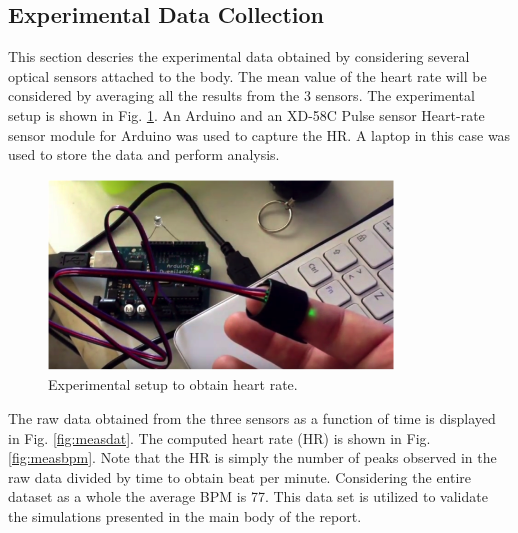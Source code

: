\documentclass[paper=a4, fontsize=11pt]{scrartcl}
\numberwithin{equation}{section}		%
\numberwithin{figure}{section}			%
\numberwithin{table}{section}		    %
\begin{document}
\newpage
\begin{appendices}

\section{Experimental Data Collection}\label{sec:A:exp}
This section descries the experimental data obtained by considering several optical sensors attached 
to the body. The mean value of the heart rate will be considered by averaging all the results from 
the 3 sensors. The experimental setup is shown in Fig. \ref{fig:exp}. An Arduino and an XD-58C Pulse 
sensor Heart-rate sensor module for Arduino was used to capture the HR. A laptop in this case was
used to store the data and perform analysis. \\

\begin{figure}[H]
	\begin{center} 
		\includegraphics[height=2in,width=3.6in]{hr_experiment} 
		\caption{Experimental setup to obtain heart rate.\label{fig:exp}} 
	\end{center} 
\end{figure}

The raw data obtained from the three sensors as a function of time is displayed in Fig. 
\ref{fig:measdat}. The computed heart rate (HR) is shown in Fig. \ref{fig:measbpm}. Note that the
HR is simply the number of peaks observed in the raw data divided by time to obtain beat per minute.
Considering the entire dataset as a whole the average BPM is 77. This data set is utilized to validate
the simulations presented in the main body of the report.\\


\end{appendices}
\end{document}
